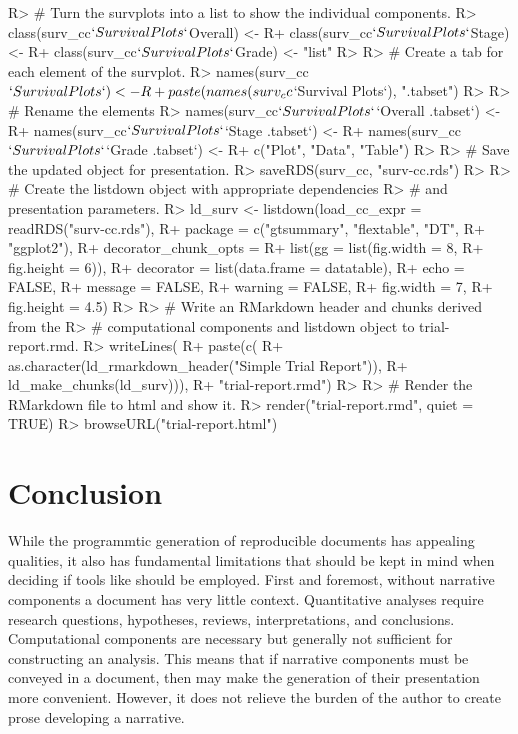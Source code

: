 \documentclass[
]{jss}
\begin{document}
\begin{CodeChunk}

\begin{CodeInput}
R> # Turn the survplots into a list to show the individual components.
R> class(surv_cc$`Survival Plots`$Overall) <- 
R+   class(surv_cc$`Survival Plots`$Stage) <-
R+   class(surv_cc$`Survival Plots`$Grade) <- "list"
R> 
R> # Create a tab for each element of the survplot.
R> names(surv_cc$`Survival Plots`) <- 
R+   paste(names(surv_cc$`Survival Plots`), "{.tabset}")
R> 
R> # Rename the elements
R> names(surv_cc$`Survival Plots`$`Overall {.tabset}`) <- 
R+   names(surv_cc$`Survival Plots`$`Stage {.tabset}`) <- 
R+   names(surv_cc$`Survival Plots`$`Grade {.tabset}`) <- 
R+   c("Plot", "Data", "Table")
R>   
R> # Save the updated object for presentation.
R> saveRDS(surv_cc, "surv-cc.rds")
R> 
R> # Create the listdown object with appropriate dependencies
R> # and presentation parameters.
R> ld_surv <- listdown(load_cc_expr = readRDS("surv-cc.rds"),
R+                     package = c("gtsummary", "flextable", "DT", 
R+                                 "ggplot2"),
R+                     decorator_chunk_opts = 
R+                       list(gg = list(fig.width = 8,
R+                                      fig.height = 6)),
R+                     decorator = list(data.frame = datatable),
R+                     echo = FALSE,
R+                     message = FALSE,
R+                     warning = FALSE,
R+                     fig.width = 7,
R+                     fig.height = 4.5)
R> 
R> # Write an RMarkdown header and chunks derived from the 
R> # computational components and listdown object to trial-report.rmd.
R> writeLines(
R+   paste(c(
R+     as.character(ld_rmarkdown_header("Simple Trial Report")),
R+     ld_make_chunks(ld_surv))),
R+   "trial-report.rmd")
R> 
R> # Render the RMarkdown file to html and show it.
R> render("trial-report.rmd", quiet = TRUE)
R> browseURL("trial-report.html")
\end{CodeInput}
\end{CodeChunk}

\hypertarget{conclusion}{%
\section{Conclusion}\label{conclusion}}

While the programmtic generation of reproducible documents has appealing
qualities, it also has fundamental limitations that should be kept in
mind when deciding if tools like  should be employed.
First and foremost, without narrative components a document has very
little context. Quantitative analyses require research questions,
hypotheses, reviews, interpretations, and conclusions. Computational
components are necessary but generally not sufficient for constructing
an analysis. This means that if narrative components must be conveyed in
a document, then  may make the generation of their
presentation more convenient. However, it does not relieve the burden of
the author to create prose developing a narrative.
\end{document}
